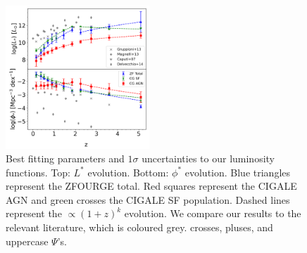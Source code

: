 \begin{figure}[h]
    \centering
    \includegraphics[width=0.48\textwidth]{Figures/Param_Evo.png}
    \caption{Best fitting parameters and $1\sigma$ uncertainties to our luminosity functions. Top: $L^{*}$ evolution. Bottom: $\phi^{*}$ evolution. Blue triangles represent the ZFOURGE total. Red squares represent the CIGALE AGN and green crosses the CIGALE SF population. Dashed lines represent the $\propto(1+z)^k$ evolution. We compare our results to the relevant literature, which is coloured grey. \cite{gruppioni_herschel_2013} crosses, \cite{magnelli_deepest_2013} pluses, and \cite{caputi_infrared_2007} uppercase $\Psi$'s.}
    \label{Fig: Param Evo}
\end{figure}

